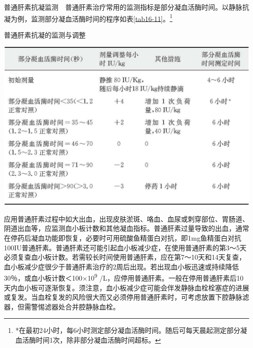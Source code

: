 普通肝素抗凝监测　普通肝素治疗常用的监测指标是部分凝血活酶时间。以静脉抗凝为例，监测部分凝血活酶时间的程序如表\ref{tab16-11}。\footnote{*在最初24小时，每6小时测定部分凝血活酶时间。随后可每天晨起测定部分凝血活酶时间1次，除非部分凝血活酶时间超标。}

\begin{table}[htbp]
\centering
\caption{普通肝素抗凝的监测与调整}
\label{tab16-11}
\includegraphics{./images/Image00131.jpg}
\end{table}



应用普通肝素过程中如大出血，出现皮肤淤斑、咯血、血尿或刺穿部位、胃肠道、阴道出血等，应监测血小板计数和其他凝血指标。普通肝素过量导致的出血，通常在停药后凝血功能即恢复，必要时可用硫酸鱼精蛋白对抗，即1mg鱼精蛋白对抗100IU普通肝素。普通肝素还可能引起血小板减少症，在使用普通肝素的第3～5天必须复查血小板计数。若需较长时间使用普通肝素，应在第7～10天和14天复查，血小板减少症很少于普通肝素治疗的2周后出现。若出现血小板迅速或持续降低30％，或血小板计数＜100×10\textsuperscript{9}
/L，应停用普通肝素。一般在停用普通肝素后10天内血小板可逐渐恢复。须注意，血小板减少症可能会伴发静脉血栓栓塞症的进展或复发。当血栓复发的风险很大而又必须停用普通肝素时，可考虑放置下腔静脉滤器，但需警惕滤器处合并腔静脉血栓。

